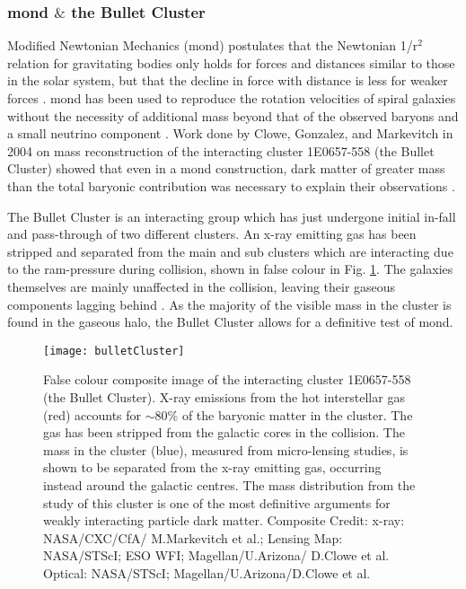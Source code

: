 \subsubsection{\gls{mond} $\&$ the Bullet Cluster}
Modified Newtonian Mechanics (\gls{mond}) postulates that the Newtonian 1/r$^{2}$ relation for gravitating bodies only holds for forces and distances similar to those in the solar system, but that the decline in force with distance is less for weaker forces \cite{Milgrom1983MOND}. \gls{mond} has been used to reproduce the rotation velocities of spiral galaxies without the necessity of additional mass beyond that of the observed baryons and a small neutrino component \cite{MilgromSanders2003MOND}. Work done by Clowe, Gonzalez, and Markevitch in 2004 on mass reconstruction of the interacting cluster 1E0657-558 (the Bullet Cluster) showed that even in a \gls{mond} construction, dark matter of greater mass than the total baryonic contribution was necessary to explain their observations \cite{Clowe2004BulletCluster}.

The Bullet Cluster is an interacting group which has just undergone initial in-fall and pass-through of two different clusters. An x-ray emitting gas has been stripped and separated from the main and sub clusters which are interacting due to the ram-pressure during collision, shown in false colour in Fig. \ref{Fig:bulletCluster}. The galaxies themselves are mainly unaffected in the collision, leaving their gaseous components lagging behind \cite{Stoehr2003DMAnnhilitation}. As the majority of the visible mass in the cluster is found in the gaseous halo, the Bullet Cluster allows for a definitive test of \gls{mond}.

\begin{figure}[ht]
 \centering
 \texttt{[image: bulletCluster]}
 \caption{False colour composite image of the interacting cluster 1E0657-558 (the Bullet Cluster). X-ray emissions from the hot interstellar gas (red) accounts for $\sim 80\%$ of the baryonic matter in the cluster. The gas has been stripped from the galactic cores in the collision. The mass in the cluster (blue), measured from micro-lensing studies, is shown to be separated from the x-ray emitting gas, occurring instead around the galactic centres. The mass distribution from the study of this cluster is one of the most definitive arguments for weakly interacting particle dark matter. Composite Credit: x-ray: NASA/CXC/CfA/ M.Markevitch et al.; Lensing Map: NASA/STScI; ESO WFI; Magellan/U.Arizona/ D.Clowe et al. Optical: NASA/STScI; Magellan/U.Arizona/D.Clowe et al. \cite{Clowe2004BulletCluster}}
 \label{Fig:bulletCluster}
\end{figure}
 
